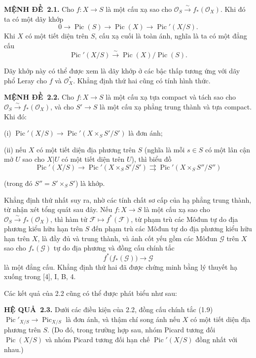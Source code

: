 \documentclass[11pt,twoside,openany]{book}
\numberwithin{equation}{section}
\newcommand{\src}[1]{%
  \phantomsection\hypertarget{src:\fgasourceid:#1}{}%
  \marginpar{\raggedleft\footnotesize\sffamily #1}%
}
\newcommand{\fgasourceid}{unset}
\newcommand{\result}[2]{\par\medskip\noindent\textbf{#1\if\relax\detokenize{#2}\relax\else\ #2\fi.}\quad}
\begin{document}
\result{MỆNH ĐỀ}{2.1} Cho $f:X\longrightarrow S$ là một cấu xạ sao cho
$\mathcal O_S\xrightarrow{\sim}f_*(\mathcal O_X)$. Khi đó ta có một dãy khớp
\[
0\longrightarrow\operatorname{Pic}(S)\longrightarrow\operatorname{Pic}(X)
\longrightarrow\operatorname{Pic}'(X/S).
\]
Khi $X$ có một tiết diện trên $S$, cấu xạ cuối là toàn ánh, nghĩa là ta có một
đẳng cấu
\[
\operatorname{Pic}'(X/S)\xrightarrow{\sim}
\operatorname{Pic}(X)/\operatorname{Pic}(S).
\]

Dãy khớp này có thể được xem là dãy khớp ở các bậc thấp tương ứng với dãy phổ
Leray cho $f$ và $\mathcal O_X^*$. Khẳng định thứ hai cũng có tính hình thức.

\result{MỆNH ĐỀ}{2.2} Cho $f:X\longrightarrow S$ là một cấu xạ tựa compact và
tách sao cho $\mathcal O_S\xrightarrow{\sim}f_*(\mathcal O_X)$, và cho
$S'\longrightarrow S$ là một cấu xạ phẳng trung thành và tựa compact. Khi đó:

\noindent (i) $\operatorname{Pic}'(X/S)\longrightarrow
\operatorname{Pic}'(X\times_SS'/S')$ là đơn ánh;

\noindent (ii) nếu $X$ có một tiết diện địa phương trên $S$ (nghĩa là mỗi
$s\in S$ có một lân cận mở $U$ sao cho $X|U$ có một tiết diện trên $U$), thì
biểu đồ
\[
\operatorname{Pic}'(X/S)\longrightarrow
\operatorname{Pic}'(X\times_SS'/S')\rightrightarrows
\operatorname{Pic}'(X\times_SS''/S'')
\]
\src{147}
(trong đó $S''=S'\times_SS'$) là khớp.

Khẳng định thứ nhất suy ra, nhờ các tính chất sơ cấp của hạ phẳng trung thành,
từ nhận xét tổng quát sau đây. Nếu $f:X\longrightarrow S$ là một cấu xạ sao cho
$\mathcal O_S\xrightarrow{\sim}f_*(\mathcal O_X)$, thì hàm tử
$\mathcal F\longmapsto f^*(\mathcal F)$, từ phạm trù các Môđun tự do địa
phương kiểu hữu hạn trên $S$ đến phạm trù các Môđun tự do địa phương kiểu hữu
hạn trên $X$, là đầy đủ và trung thành, và ảnh cốt yếu gồm các Môđun
$\mathcal G$ trên $X$ sao cho $f_*(\mathcal G)$ tự do địa phương và đồng cấu
chính tắc
\[
f^*\bigl(f_*(\mathcal G)\bigr)\longrightarrow\mathcal G
\]
là một đẳng cấu. Khẳng định thứ hai đã được chứng minh bằng lý thuyết hạ xuống
trong [4], I, B, 4.

Các kết quả của 2.2 cũng có thể được phát biểu như sau:

\result{HỆ QUẢ}{2.3} Dưới các điều kiện của 2.2, đồng cấu chính tắc
(1.9) $\operatorname{Pic}'_{X/S}\longrightarrow\operatorname{Pic}_{X/S}$ là
đơn ánh, và thậm chí song ánh nếu $X$ có một tiết diện địa phương trên $S$.
(Do đó, trong trường hợp sau, nhóm Picard tương đối
$\operatorname{Pic}(X/S)$ và nhóm Picard tương đối hạn chế
$\operatorname{Pic}'(X/S)$ đồng nhất với nhau.)
\end{document}
